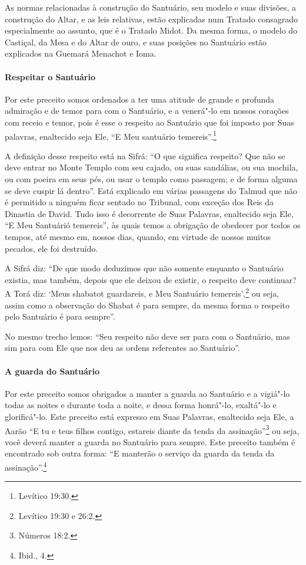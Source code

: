 \begin{multicols}{2}
As normas relacionadas à construção do Santuário, seu modelo e suas
divisões, a construção do Altar, e as leis relativas, estão explicadas
num Tratado consagrado especialmente ao assunto, que é o Tratado Midot\starr.
Da mesma forma, o modelo do Castiçal, da Mesa e do Altar de ouro, e suas
posições no Santuário estão explicados na Guemará\starr{} Menachot\starr{} e Ioma\starr.

\paragraph{Respeitar o Santuário}

Por este preceito somos ordenados a ter uma atitude de grande e profunda
admiração e de temor para com o Santuário, e a venerá"-lo em nossos
corações com receio e temor, pois é esse o respeito ao Santuário que foi
imposto por Suas palavras, enaltecido seja Ele, ``E Meu santuário
temereis''.\footnote{Levítico 19:30.}

A definição desse respeito está na Sifrá\starr: ``O que significa respeito?
Que não se deve entrar no Monte Templo\starr{} com seu cajado, ou suas
sandálias, ou sua mochila, ou com poeira em seus pés, ou usar o templo
como passagem; e de forma alguma se deve cuspir lá dentro''. Está
explicado em várias passagens do Talmud\starr{} que não é permitido a ninguém
ficar sentado no Tribunal, com exceção dos Reis da Dinastia de David.
Tudo isso é decorrente de Suas Palavras, enaltecido seja Ele, ``E Meu
Santuárió temereis'', às quais temos a obrigação de obedecer por todos
os tempos, até mesmo em, nossos dias, quando, em virtude de nossos
muitos pecados, ele foi destruído.

A Sifrá\starr{} diz: ``De que modo deduzimos que não somente enquanto o
Santuário existia, mas também, depois que ele deixou de existir, o
respeito deve continuar? A Torá\starr{} diz: `Meus shabatot\starr{} guardareis,
e Meu Santuário temereis',\footnote{Levítico 19:30 e 26:2.} ou seja, assim como a observação do
Shabat é para sempre, da mesma forma o respeito pelo Santuário é para
sempre''.

No mesmo trecho lemos: ``Seu respeito não deve ser para com o Santuário,
mas sim para com Ele que nos deu as ordens referentes ao Santuário''.

\paragraph{A guarda do Santuário}

Por este preceito somos obrigados a manter a guarda ao Santuário e a
vigiá"-lo todas as noites e durante toda a noite, e dessa forma honrá"-lo,
exaltá"-lo e glorificá"-lo. Este preceito está expresso em Suas Palavras,
enaltecido seja Ele, a Aarão ``E tu e teus filhos contigo, estareis
diante da tenda da assinação''\footnote{Números 18:2.} ou seja, você deverá
manter a guarda no Santuário para sempre. Este preceito também é
encontrado sob outra forma: ``E manterão o serviço da guarda da tenda da
assinação''.\footnote{Ibid., 4.}



\end{multicols}
